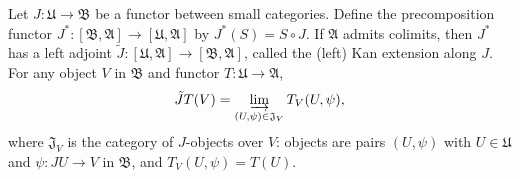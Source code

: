 Let $J: \mathfrak{U} \rightarrow \mathfrak{B}$ be a functor between small categories. Define the precomposition functor $J^* : [\mathfrak{B}, \mathfrak{A}] \rightarrow [\mathfrak{U}, \mathfrak{A}]$ by $J^*(S) = S \circ J$. If $\mathfrak{A}$ admits colimits, then $J^*$ has a left adjoint $\tilde{J}: [\mathfrak{U}, \mathfrak{A}] \rightarrow [\mathfrak{B}, \mathfrak{A}]$, called the (left) Kan extension along $J$. For any object $V$ in $\mathfrak{B}$ and functor $T: \mathfrak{U} \rightarrow \mathfrak{A}$,
$$
\tilde{J}T(V) = \varinjlim_{(U,\psi) \in \mathfrak{J}_V} T_V(U,\psi),
$$
where $\mathfrak{J}_V$ is the category of $J$-objects over $V$: objects are pairs $(U, \psi)$ with $U \in \mathfrak{U}$ and $\psi: JU \rightarrow V$ in $\mathfrak{B}$, and $T_V(U,\psi) = T(U)$.
